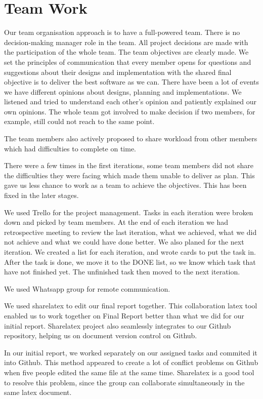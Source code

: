 \documentclass[11pt]{article}
\begin{document}
\pagebreak
\section{Team Work}
Our team organisation approach is to have a full-powered team. There is no decision-making manager role in the team. All project decisions are made with the participation of the whole team. 
The team objectives are clearly made. We set the principles of communication that  every member opens for questions and suggestions about their designs and implementation with the shared final  objective is to deliver the best software as we can. 
There have been a lot of events we have different opinions about designs, planning and implementations. We listened and tried to understand each other's opinion and patiently explained our own opinions. The whole team got involved to make decision if two members, for example, still could not reach to the same point. 

The team members also actively proposed to share workload from other members which had difficulties to complete on time.

There were a few times in the first iterations, some team members did not share the difficulties they were facing which made them unable to deliver as plan. This gave us less chance to work as a team to achieve the objectives. This  has been fixed in the later stages. 

We used Trello for the project management. Tasks in each iteration were broken down and picked by team members. At the end of each iteration we had retrospective meeting to review the last iteration, what we achieved, what we did not achieve and what we could have done better. We also planed for the next iteration. We created a list for each iteration, and wrote cards to put the task in. After the task is done, we move it to the DONE list, so we know which task that have not finished yet. The unfinished task then moved to the next iteration.

We used Whatsapp group for remote communication. 
 

We used sharelatex to edit our final report together. This collaboration latex tool enabled us to work together on Final Report better than what we did for our initial report. Sharelatex project also seamlessly integrates to our Github repository, helping us on document version control on Github. 

In our initial report, we  worked  separately on our assigned tasks and commited it into Github. This method appeared to create a lot of conflict problems on Github when five people edited the same file at the same time. 
Sharelatex is a good tool to resolve this problem, since the group can collaborate simultaneously in the same latex document. 
\end{document}
